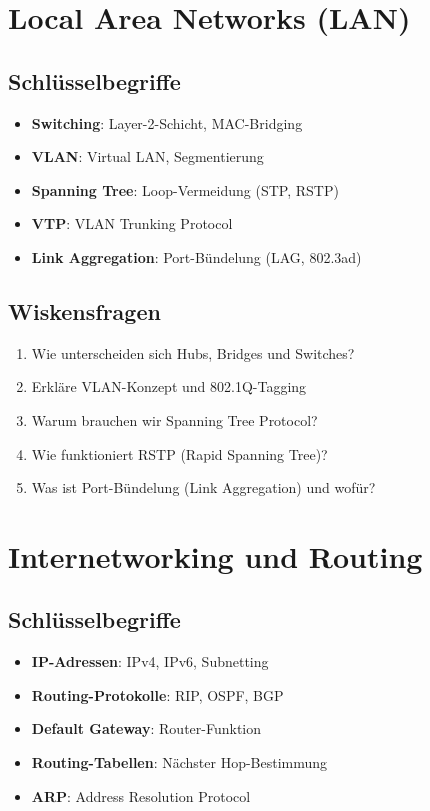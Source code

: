 \documentclass[12pt,a4paper,german]{report}
\begin{document}
\chapter{Local Area Networks (LAN)}

\section{Schlüsselbegriffe}
\begin{itemize}
    \item \textbf{Switching}: Layer-2-Schicht, MAC-Bridging
    \item \textbf{VLAN}: Virtual LAN, Segmentierung
    \item \textbf{Spanning Tree}: Loop-Vermeidung (STP, RSTP)
    \item \textbf{VTP}: VLAN Trunking Protocol
    \item \textbf{Link Aggregation}: Port-Bündelung (LAG, 802.3ad)
\end{itemize}

\section{Wiskensfragen}
\begin{enumerate}
    \item Wie unterscheiden sich Hubs, Bridges und Switches?
    \item Erkläre VLAN-Konzept und 802.1Q-Tagging
    \item Warum brauchen wir Spanning Tree Protocol?
    \item Wie funktioniert RSTP (Rapid Spanning Tree)?
    \item Was ist Port-Bündelung (Link Aggregation) und wofür?
\end{enumerate}

\chapter{Internetworking und Routing}

\section{Schlüsselbegriffe}
\begin{itemize}
    \item \textbf{IP-Adressen}: IPv4, IPv6, Subnetting
    \item \textbf{Routing-Protokolle}: RIP, OSPF, BGP
    \item \textbf{Default Gateway}: Router-Funktion
    \item \textbf{Routing-Tabellen}: Nächster Hop-Bestimmung
    \item \textbf{ARP}: Address Resolution Protocol
\end{itemize}
\end{document}
